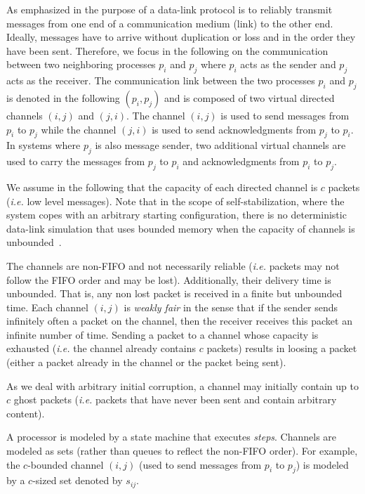 \documentclass[11pt]{article}
\begin{document}
As emphasized in \cite{AB93j} the purpose of a data-link protocol is to reliably transmit messages from one end of a communication medium (link) to the other end. Ideally, messages have to arrive without duplication or loss and in the order they have been sent. Therefore, we focus in the following on the communication between two neighboring processes $p_i$ and $p_j$ where $p_i$ acts as the sender and $p_j$ acts as the receiver. The communication link between the two processes $p_i$ and $p_j$ is denoted in the following $(p_i,p_j)$ and is composed of two virtual directed channels $(i,j)$ and $(j,i)$. The channel $(i,j)$ is used to send messages from $p_i$ to $p_j$ while the channel $(j,i)$ is used to send acknowledgments from $p_j$ to $p_i$. In systems where $p_j$ is also message sender, two additional virtual channels are used to carry the messages from $p_j$ to $p_i$ and acknowledgments from $p_i$ to $p_j$.

We assume in the following that the capacity of each directed channel is $c$ packets (\emph{i.e.} low level messages). Note that in the scope of self-stabilization, where the system copes with an arbitrary starting configuration, there is no deterministic data-link simulation that uses bounded memory when the capacity of channels is unbounded~\cite{GM91j,DIM97j}.

The channels are non-FIFO and not necessarily reliable (\emph{i.e. } packets may not follow the FIFO order and may be lost). Additionally, their delivery time is unbounded. That is, any non lost packet is received in a finite but unbounded time. Each channel $(i,j)$ is \emph{weakly fair} in the sense that if the sender sends infinitely often a packet on the channel, then the receiver receives this packet an infinite number of time. Sending a packet to a channel whose capacity is exhausted (\emph{i.e.} the channel already contains $c$ packets) results in loosing a packet (either a packet already in the channel or the packet being sent). 

As we deal with arbitrary initial corruption, a channel may initially contain up to $c$ ghost packets (\emph{i.e.} packets that have never been sent and contain arbitrary content).

A processor is modeled by a state machine that executes \emph{steps}. Channels are modeled as sets (rather than queues to reflect the non-FIFO order). For example, the $c$-bounded channel $(i,j)$ (used to send messages from $p_i$ to $p_j$) is modeled by a $c$-sized set denoted by $s_{ij}$.
\end{document}
